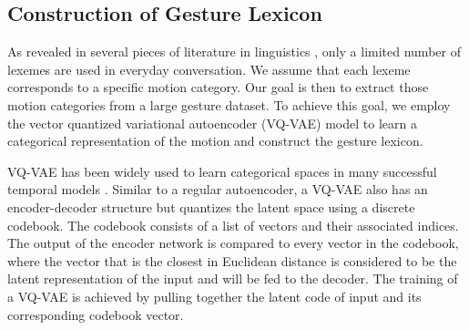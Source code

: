 \subsection{Construction of Gesture Lexicon}
\label{subsec:gesture_style_embedding}
As revealed in several pieces of literature in linguistics \cite{Neff2008Gesture,Kipp2004_Gesture,Webb1996_Linguistic}, only a limited number of lexemes are used in everyday conversation. We assume that each lexeme corresponds to a specific motion category. Our goal is then to extract those motion categories from a large gesture dataset. To achieve this goal, we employ the vector quantized variational autoencoder (VQ-VAE) model \cite{oord2017neural} to learn a categorical representation of the motion and construct the gesture lexicon.

VQ-VAE has been widely used to learn categorical spaces in many successful temporal models \cite{prafulla2020jukebox, baevski2020vq-wav2vec, yan2021videogpt,ramesh2021DALLE}. Similar to a regular autoencoder, a VQ-VAE also has an encoder-decoder structure but quantizes the latent space using a discrete codebook. The codebook consists of a list of vectors and their associated indices. The output of the encoder network is compared to every vector in the codebook, where the vector that is the closest in Euclidean distance is considered to be the latent representation of the input and will be fed to the decoder. The training of a VQ-VAE is achieved by pulling together the latent code of input and its corresponding codebook vector.


